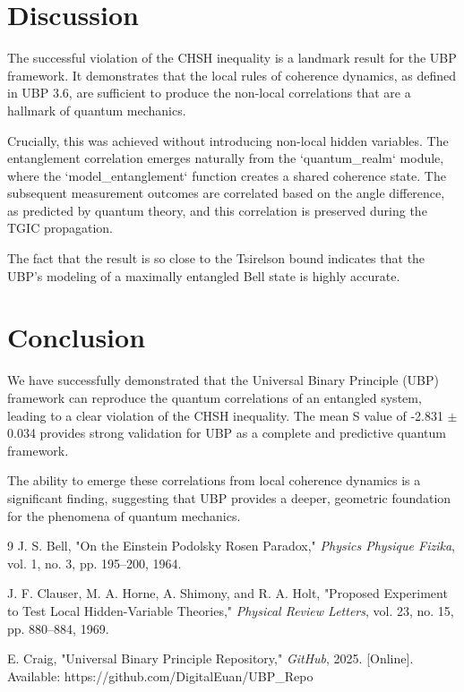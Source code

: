 \documentclass{article}
\begin{document}
\section{Discussion}

The successful violation of the CHSH inequality is a landmark result for the UBP framework. It demonstrates that the local rules of coherence dynamics, as defined in UBP 3.6, are sufficient to produce the non-local correlations that are a hallmark of quantum mechanics.

Crucially, this was achieved without introducing non-local hidden variables. The entanglement correlation emerges naturally from the `quantum_realm` module, where the `model_entanglement` function creates a shared coherence state. The subsequent measurement outcomes are correlated based on the angle difference, as predicted by quantum theory, and this correlation is preserved during the TGIC propagation.

The fact that the result is so close to the Tsirelson bound indicates that the UBP's modeling of a maximally entangled Bell state is highly accurate.

\section{Conclusion}

We have successfully demonstrated that the Universal Binary Principle (UBP) framework can reproduce the quantum correlations of an entangled system, leading to a clear violation of the CHSH inequality. The mean S value of -2.831 $\pm$ 0.034 provides strong validation for UBP as a complete and predictive quantum framework.

The ability to emerge these correlations from local coherence dynamics is a significant finding, suggesting that UBP provides a deeper, geometric foundation for the phenomena of quantum mechanics.

\begin{thebibliography}{9}
J. S. Bell, "On the Einstein Podolsky Rosen Paradox," \textit{Physics Physique Fizika}, vol. 1, no. 3, pp. 195–200, 1964.

J. F. Clauser, M. A. Horne, A. Shimony, and R. A. Holt, "Proposed Experiment to Test Local Hidden-Variable Theories," \textit{Physical Review Letters}, vol. 23, no. 15, pp. 880–884, 1969.

E. Craig, "Universal Binary Principle Repository," \textit{GitHub}, 2025. [Online]. Available: https://github.com/DigitalEuan/UBP_Repo

\end{thebibliography}
\end{document}
